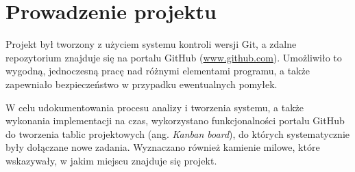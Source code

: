 \section{Prowadzenie projektu}
Projekt był tworzony z użyciem systemu kontroli wersji Git, a zdalne repozytorium znajduje się na portalu GitHub (\url{www.github.com}). Umożliwiło to wygodną, jednoczesną pracę nad różnymi elementami programu, a także zapewniało bezpieczeństwo w przypadku ewentualnych pomyłek.

W celu udokumentowania procesu analizy i tworzenia systemu, a także wykonania implementacji na czas, wykorzystano funkcjonalności portalu GitHub do tworzenia tablic projektowych (ang. \textit{Kanban board}), do których systematycznie były dołączane nowe zadania. Wyznaczano również kamienie milowe, które wskazywały, w jakim miejscu znajduje się projekt. 